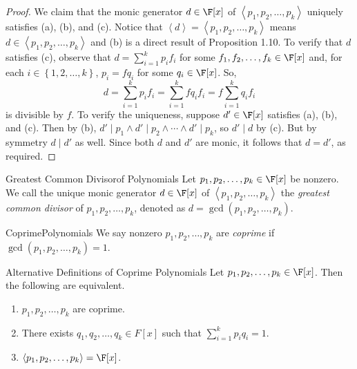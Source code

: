 \documentclass[math_245.tex]{subfiles}
\begin{document}
    \begin{proof}
        We claim that the monic generator $d\in \F[x]$ of $\left< p_1, p_2, \ldots, p_k \right>$ uniquely satisfies (a), (b), and (c). Notice that $\left< d \right> = \left< p_1, p_2, \ldots, p_k \right>$ means $d\in \left< p_1, p_2, \ldots, p_k \right>$ and (b) is a direct result of Proposition 1.10. To verify that $d$ satisfies (c), observe that $d = \sum^{k}_{i=1} p_if_i$ for some $f_1, f_2, \ldots, f_k\in \F[x]$ and, for each $i\in \left\lbrace 1, 2, \ldots, k \right\rbrace
        $, $p_i = fq_i$ for some $q_i\in \F[x]$. So,
        \begin{equation*}
            d = \sum^{k}_{i=1} p_if_i = \sum^{k}_{i=1}  fq_if_i = f \sum^{k}_{i=1} q_if_i
        \end{equation*}
        is divisible by $f$. To verify the uniqueness, suppose $d'\in\F[x]$ satisfies (a), (b), and (c). Then by (b), $d'\mid p_1\land d'\mid p_2\land\cdots\land d'\mid p_k$, so $d'\mid d$ by (c). But by symmetry $d\mid d'$ as well. Since both $d$ and $d'$ are monic, it follows that $d=d'$, as required.
    \end{proof}

    \begin{definition}{Greatest Common Divisor}{of Polynomials}
        Let $p_1, p_2, \ldots, p_k\in \F[x]$ be nonzero. We call the unique monic generator $d\in \F[x]$ of $\left< p_1, p_2, \ldots, p_k \right>$ the \emph{greatest common divisor} of $p_1, p_2, \ldots, p_k$, denoted as $d = \gcd \left( p_1, p_2, \ldots, p_k \right)$. 
    \end{definition}

    \begin{definition}{Coprime}{Polynomials}
        We say nonzero $p_1, p_2, \ldots, p_k$ are \emph{coprime} if $\gcd(p_1, p_2, \ldots, p_k) = 1$.
    \end{definition}

    \begin{prop}{Alternative Definitions of Coprime Polynomials}
        Let $p_1, p_2, \ldots, p_k\in \F[x]$. Then the following are equivalent.
        \begin{enumerate}
            \item $p_1, p_2, \ldots, p_k$ are coprime.
            \item There exists $q_1, q_2, \ldots, q_k\in F[x]$ such that $\sum^k_{i=1} p_iq_i = 1$.
            \item $\left< p_1, p_2, \ldots, p_k \right> = \F[x]$. 
        \end{enumerate}
    \end{prop}
\end{document}
